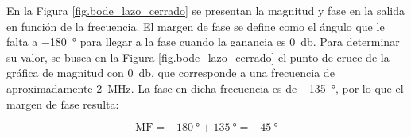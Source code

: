 
En la Figura \ref{fig.bode_lazo_cerrado} se presentan la magnitud y fase en la salida en función de la frecuencia.
El margen de fase se define como el ángulo que le falta a \SI{-180}{\degree} para llegar a la fase cuando la ganancia es \SI{0}{\decibel}. Para determinar su valor, se busca en la Figura \ref{fig.bode_lazo_cerrado} el punto de cruce de la gráfica de magnitud con \SI{0}{\decibel}, que corresponde a una frecuencia de aproximadamente \SI{2}{\mega\hertz}.  La fase en dicha frecuencia es de \SI{-135}{\degree}, por lo que el margen de fase resulta:

	$$ \mathrm{MF} = \SI{-180}{\degree} + \SI{135}{\degree} = \boxed{\SI{-45}{\degree}} $$

